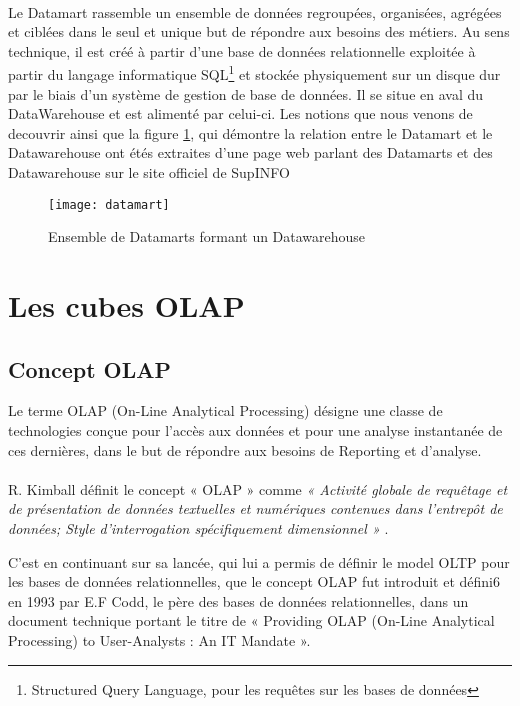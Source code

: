 \paragraph{}
Le Datamart rassemble un ensemble de données regroupées, organisées, agrégées et ciblées dans le seul et unique but de répondre aux besoins des métiers. Au sens technique, il est créé à partir d’une base de données relationnelle exploitée à partir du langage informatique SQL\footnote{Structured Query Language, pour les requêtes sur les bases de données} et stockée physiquement sur un disque dur par le biais d’un système de gestion de base de données. Il se situe en aval du DataWarehouse et est alimenté par celui-ci. Les notions que nous venons de decouvrir ainsi que la figure \ref{fig:datamart}, qui démontre la relation entre le Datamart et le Datawarehouse ont étés extraites d'une page web parlant des Datamarts et des Datawarehouse sur le site officiel de SupINFO \cite{WEBSITE:2}
\begin{figure}[H]
    \centering
    \texttt{[image: datamart]}
    \caption{Ensemble de Datamarts formant un Datawarehouse}
    \label{fig:datamart}
\end{figure}


\section{Les cubes OLAP}

\subsection{Concept OLAP}
Le terme OLAP (On-Line Analytical Processing) désigne une classe de technologies conçue pour l’accès aux données et pour une analyse instantanée de ces dernières, dans le but de répondre aux besoins de Reporting et d’analyse.
\paragraph{}
R. Kimball définit le concept « OLAP » comme \textit{« Activité globale de requêtage et de
présentation de données textuelles et numériques contenues dans l’entrepôt de données; Style
d’interrogation spécifiquement dimensionnel » }. \cite{book:14}

C’est en continuant sur sa lancée, qui lui a permis de définir le model OLTP pour les bases de données relationnelles, que le concept OLAP fut introduit et défini6 en 1993 par E.F Codd, le père des bases de données relationnelles, dans un document technique portant le titre de « Providing OLAP (On-Line Analytical Processing) to User-Analysts : An IT Mandate ». \cite{ARTICLE:1}

